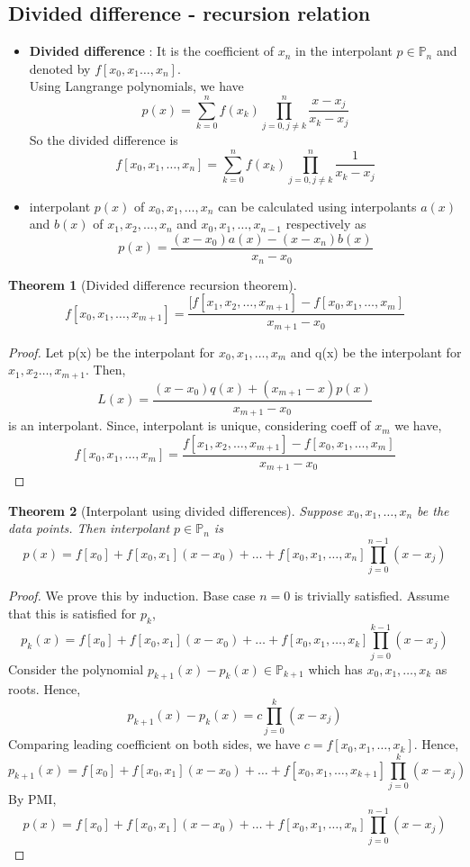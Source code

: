 \documentclass{article}
\newtheorem*{theorem}{Theorem}
\begin{document}
\subsection{Divided difference - recursion relation}
	\begin{itemize}
		\item \textbf{Divided difference} : It is the coefficient of $x_n$ in the interpolant $p \in \mathbb{P}_n$ and denoted by $f[x_0,x_1\hdots,x_n]$.\\
		Using Langrange polynomials, we have
		\[p(x)=\sum_{k=0}^n f(x_k) \prod_{j=0, j\neq k}^n \frac{x-x_j}{x_k-x_j}\]
		So the divided difference is
		\[f[x_0,x_1,\hdots,x_n]=\sum_{k=0}^n f(x_k) \prod_{j=0, j\neq k}^n \frac{1}{x_k-x_j}\]

		\item interpolant $p(x)$ of  $x_0,x_1,\hdots,x_n$ can be calculated using interpolants $a(x)$ and $b(x)$ of $x_1,x_2,\hdots,x_n$ and $x_0,x_1,\hdots,x_{n-1}$ respectively as 
			\[p(x)=\frac{(x-x_0)a(x)-(x-x_n)b(x)}{x_n-x_0}\]
	\end{itemize}

	\begin{theorem}[Divided difference recursion theorem]
		\[\boxed{f[x_0,x_1,\hdots,x_{m+1}] = \frac{[f[x_1, x_2,\hdots,x_{m+1}] - f[x_0,x_1,\hdots,x_{m}]}{x_{m+1}-x_0}}\]
	\end{theorem}
	\begin{proof}
		Let p(x) be the interpolant for $x_0,x_1,\hdots,x_m$ and q(x) be the interpolant for $x_1,x_2\hdots,x_{m+1}$. Then,
		\[L(x)= \frac{(x-x_0)q(x)+(x_{m+1}-x)p(x)}{x_{m+1}-x_0}\] is an interpolant.
		Since, interpolant is unique, considering coeff of $x_{m}$ we have,
		\[f[x_0,x_1,\hdots, x_m]=  \frac{f[x_1, x_2,\hdots,x_{m+1}] - f[x_0,x_1,\hdots,x_{m}]}{x_{m+1}-x_0}\]
	\end{proof}

	\begin{theorem}[Interpolant using divided differences]
		Suppose $x_0,x_1,\hdots,x_n$ be the data points. Then interpolant $p \in \mathbb{P}_n$ is
		\[\boxed{p(x)=f[x_0]+f[x_0,x_1](x-x_0)+ \hdots +f[x_0,x_1,\hdots,x_n] \prod_{j=0}^{n-1}(x-x_j)}\]
	\end{theorem}

	\begin{proof}
		We prove this by induction. Base case $n=0$ is trivially satisfied.
		Assume that this is satisfied for $p_{k}$,
		\[p_k(x)=f[x_0]+f[x_0,x_1](x-x_0)+ \hdots +f[x_0,x_1,\hdots,x_k] \prod_{j=0}^{k-1}(x-x_j)\]
		Consider the polynomial $p_{k+1}(x)-p_k(x) \in \mathbb{P}_{k+1}$ which has $x_0,x_1,\hdots,x_k$ as roots. Hence,
		\[p_{k+1}(x)-p_k(x) = c\prod_{j=0}^k(x-x_j)\]
		Comparing leading coefficient on both sides, we have $c=f[x_0,x_1,\hdots,x_k]$. Hence,
		\[p_{k+1}(x)=f[x_0]+f[x_0,x_1](x-x_0)+ \hdots +f[x_0,x_1,\hdots,x_{k+1}] \prod_{j=0}^{k}(x-x_j)\]
		By PMI,
		\[p(x)=f[x_0]+f[x_0,x_1](x-x_0)+ \hdots +f[x_0,x_1,\hdots,x_n] \prod_{j=0}^{n-1}(x-x_j)\]


	\end{proof}
\end{document}
